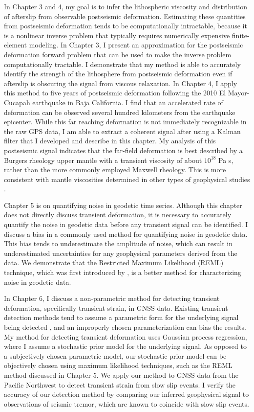In Chapter 3 and 4, my goal is to infer the lithospheric viscosity and
distribution of afterslip from observable postseismic deformation.
Estimating these quantities from postseismic deformation tends to be
computationally intractable, because it is a nonlinear inverse problem
that typically requires numerically expensive finite-element modeling.
In Chapter 3, I present an approximation for the postseismic
deformation forward problem that can be used to make the inverse
problem computationally tractable. I demonstrate that my method is
able to accurately identify the strength of the lithosphere from
postseismic deformation even if afterslip is obscuring the signal from
viscous relaxation. In Chapter 4, I apply this method to five years of
postseismic deformation following the 2010 El Mayor-Cucapah earthquake
in Baja California. I find that an accelerated rate of deformation can
be observed several hundred kilometers from the earthquake epicenter.
While this far reaching deformation is not immediately recognizable in
the raw GPS data, I am able to extract a coherent signal after using a
Kalman filter that I developed and describe in this chapter. My
analysis of this postseismic signal indicates that the far-field
deformation is best described by a Burgers rheology upper mantle with
a transient viscosity of about $10^{18}$ Pa s, rather than the more
commonly employed Maxwell rheology. This is more consistent with
mantle viscosities determined in other types of geophysical studies
\citep[e.g.,][]{Crittenden1967,Bills1987}.

Chapter 5 is on quantifying noise in geodetic time series. Although
this chapter does not directly discuss transient deformation, it is
necessary to accurately quantify the noise in geodetic data before any
transient signal can be identified. I discuss a bias in a commonly
used method for quantifying noise in geodetic data. This bias tends to
underestimate the amplitude of noise, which can result in
underestimated uncertainties for any geophysical parameters derived
from the data. We demonstrate that the Restricted Maximum Likelihood
(REML) technique, which was first introduced by \citet{Patterson1971},
is a better method for characterizing noise in geodetic data.

In Chapter 6, I discuss a non-parametric method for detecting
transient deformation, specifically transient strain, in GNSS data.
Existing transient detection methods tend to assume a parametric form
for the underlying signal being detected \citep[e.g.,][]{Ohtani2010},
and an improperly chosen parameterization can bias the results. My
method for detecting transient deformation uses Gaussian process
regression, where I assume a stochastic prior model for the underlying
signal. As opposed to a subjectively chosen parametric model, our
stochastic prior model can be objectively chosen using maximum
likelihood techniques, such as the REML method discussed in Chapter 5.
We apply our method to GNSS data from the Pacific Northwest to detect
transient strain from slow slip events. I verify the accuracy of our
detection method by comparing our inferred geophysical signal to
observations of seismic tremor, which are known to coincide with slow
slip events.

